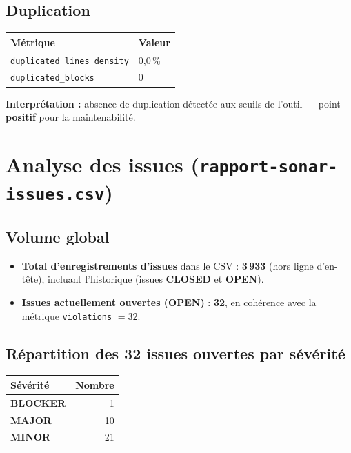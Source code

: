 \documentclass[11pt,a4paper]{article}
\begin{document}
\subsection{Duplication}

\begin{table}[h]
  \centering
  \begin{tabular}{@{}ll@{}}
    \toprule
    \textbf{Métrique} & \textbf{Valeur} \\
    \midrule
    \texttt{duplicated\_lines\_density} & 0,0\,\% \\
    \texttt{duplicated\_blocks} & 0 \\
    \bottomrule
  \end{tabular}
\end{table}

\textbf{Interprétation :} absence de duplication détectée aux seuils de l'outil --- point \textbf{positif} pour la maintenabilité.

\section{Analyse des issues (\texttt{rapport-sonar-issues.csv})}
\label{sec:issues}

\subsection{Volume global}

\begin{itemize}
  \item \textbf{Total d'enregistrements d'issues} dans le CSV : \textbf{3\,933} (hors ligne d'en-tête), incluant l'historique (issues \textbf{CLOSED} et \textbf{OPEN}).
  \item \textbf{Issues actuellement ouvertes (OPEN)} : \textbf{32}, en cohérence avec la métrique \texttt{violations} $= 32$.
\end{itemize}

\subsection{Répartition des 32 issues ouvertes par sévérité}

\begin{table}[h]
  \centering
  \begin{tabular}{@{}lr@{}}
    \toprule
    \textbf{Sévérité} & \textbf{Nombre} \\
    \midrule
    \textbf{BLOCKER} & 1 \\
    \textbf{MAJOR} & 10 \\
    \textbf{MINOR} & 21 \\
    \bottomrule
  \end{tabular}
\end{table}
\end{document}
